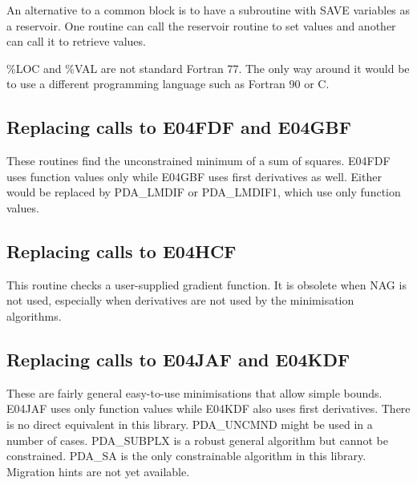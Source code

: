 \documentclass[11pt,twoside]{article}
\newcommand{\htmlref}[2]{#1}
\newcommand{\xlabel}[1]{}
\begin{document}
   An alternative to a common block is to have a subroutine with SAVE
   variables as a reservoir. One routine can call the reservoir routine
   to set values and another can call it to retrieve values.

   \%LOC and \%VAL are not standard Fortran 77. The only way around it
   would be to use a different programming language such as Fortran 90
   or C.


\subsection{\xlabel{replacing_calls_to_e04fdf_and_e04gbf}Replacing calls to E04FDF and E04GBF}

   These routines find the unconstrained minimum of a sum of squares.
   E04FDF uses function values only while E04GBF uses first derivatives
   as well. Either would be replaced by
\htmlref{PDA\_LMDIF}{PDA\_LMDIF}
   or
\htmlref{PDA\_LMDIF1,}{PDA\_LMDIF1}
   which use only function values.


\subsection{\xlabel{replacing_calls_to_e04hcf}Replacing calls to E04HCF}

   This routine checks a user-supplied gradient function. It is obsolete
   when NAG is not used, especially when derivatives are not used by the
   minimisation algorithms.


\subsection{\xlabel{replacing_calls_to_e04jaf_and_e04kdf}Replacing calls to E04JAF and E04KDF}

   These are fairly general easy-to-use minimisations that allow simple
   bounds. E04JAF uses only function values while E04KDF also uses first
   derivatives. There is no direct equivalent in this library.
\htmlref{PDA\_UNCMND}{PDA\_UNCMND}
   might
   be used in a number of cases.
\htmlref{PDA\_SUBPLX}{PDA\_SUBPLX}
   is a
   robust general algorithm but cannot be constrained.
\htmlref{PDA\_SA}{PDA\_SA}
   is the only constrainable algorithm in this library.
   Migration hints are not yet available.
\end{document}
